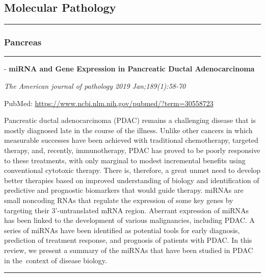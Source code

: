 \documentclass[]{article}
\begin{document}
\pagebreak

\hypertarget{molecular-pathology}{%
\subsection{Molecular Pathology}\label{molecular-pathology}}

\begin{center}\rule{0.5\linewidth}{\linethickness}\end{center}

\hypertarget{pancreas-2}{%
\subsubsection{Pancreas}\label{pancreas-2}}

\begin{center}\rule{0.5\linewidth}{\linethickness}\end{center}

 - \textbf{miRNA and Gene Expression in Pancreatic Ductal
Adenocarcinoma}

\emph{The American journal of pathology 2019 Jan;189(1):58-70}

PubMed: \url{https://www.ncbi.nlm.nih.gov/pubmed/?term=30558723}

Pancreatic ductal adenocarcinoma (PDAC) remains a challenging disease
that is mostly diagnosed late in the course of the illness. Unlike other
cancers in which measurable successes have been achieved with
traditional chemotherapy, targeted therapy, and, recently,
immunotherapy, PDAC has proved to be poorly responsive to these
treatments, with only marginal to modest incremental benefits using
conventional cytotoxic therapy. There is, therefore, a great unmet need
to develop better therapies based on improved understanding of biology
and identification of predictive and prognostic biomarkers that would
guide therapy. miRNAs are small noncoding RNAs that regulate the
expression of some key genes by targeting their 3'-untranslated mRNA
region. Aberrant expression of miRNAs has been linked to the development
of various malignancies, including PDAC. A series of miRNAs have been
identified as potential tools for early diagnosis, prediction of
treatment response, and prognosis of patients with PDAC. In this review,
we present a summary of the miRNAs that have been studied in PDAC in
the~context of disease biology.

{}

{}

\begin{center}\rule{0.5\linewidth}{\linethickness}\end{center}
\end{document}
